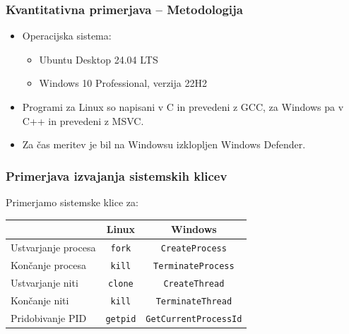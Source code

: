 \documentclass{beamer}
\begin{document}
\begin{frame}
	\frametitle{Kvantitativna primerjava -- Metodologija}
	\begin{itemize}
		\item Operacijska sistema:
		      \begin{itemize}
		      	\item Ubuntu Desktop 24.04 LTS
		      	\item Windows 10 Professional, verzija 22H2
		      \end{itemize}
		\item Programi za Linux so napisani v C in prevedeni z GCC, za Windows pa v C++ in prevedeni z MSVC.
		\item Za čas meritev je bil na Windowsu izklopljen Windows Defender.
	\end{itemize}
\end{frame}


\begin{frame}
	\frametitle{Primerjava izvajanja sistemskih klicev}
	Primerjamo sistemske klice za:
	\begin{table}
		\begin{center}
			\begin{tabular}{ l|c|c }
				                    & \textbf{Linux}  & \textbf{Windows}             \\
				\hline
				Ustvarjanje procesa & \texttt{fork}   & \texttt{CreateProcess}       \\
				Končanje procesa   & \texttt{kill}   & \texttt{TerminateProcess}    \\
				Ustvarjanje niti    & \texttt{clone}  & \texttt{CreateThread}        \\
				Končanje niti      & \texttt{kill}   & \texttt{TerminateThread}     \\
				Pridobivanje PID    & \texttt{getpid} & \texttt{GetCurrentProcessId} \\
			\end{tabular}
		\end{center}
	\end{table}
\end{frame}
\end{document}
